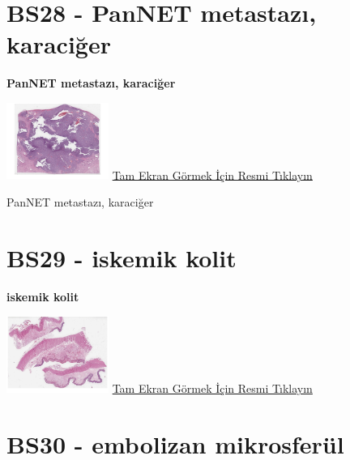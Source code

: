 \documentclass[
  letterpaper,
  DIV=11,
  numbers=noendperiod]{scrreprt}
\begin{document}
\hypertarget{sec-BS28}{%
\section{BS28 - PanNET metastazı, karaciğer}\label{sec-BS28}}

\textbf{PanNET metastazı, karaciğer}

\href{https://images.patolojiatlasi.com/BS28/HE.html}{\includegraphics[width=0.25\textwidth,height=\textheight]{./screenshots/thumbnail_BS28-HE.png}}
\href{https://images.patolojiatlasi.com/BS28/HE.html}{Tam Ekran Görmek
İçin Resmi Tıklayın}

\begin{tcolorbox}[enhanced jigsaw, breakable, opacitybacktitle=0.6, arc=.35mm, colbacktitle=quarto-callout-tip-color!10!white, colback=white, toptitle=1mm, left=2mm, opacityback=0, colframe=quarto-callout-tip-color-frame, titlerule=0mm, rightrule=.15mm, bottomrule=.15mm, toprule=.15mm, bottomtitle=1mm, title=\textcolor{quarto-callout-tip-color}{\faLightbulb}\hspace{0.5em}{Tanı}, coltitle=black, leftrule=.75mm]

PanNET metastazı, karaciğer

\end{tcolorbox}

\hypertarget{sec-BS29}{%
\section{BS29 - iskemik kolit}\label{sec-BS29}}

\textbf{iskemik kolit}

\href{https://images.patolojiatlasi.com/BS29/HE.html}{\includegraphics[width=0.25\textwidth,height=\textheight]{./screenshots/thumbnail_BS29-HE.png}}
\href{https://images.patolojiatlasi.com/BS29/HE.html}{Tam Ekran Görmek
İçin Resmi Tıklayın}

\hypertarget{sec-BS30}{%
\section{BS30 - embolizan mikrosferül}\label{sec-BS30}}
\end{document}
